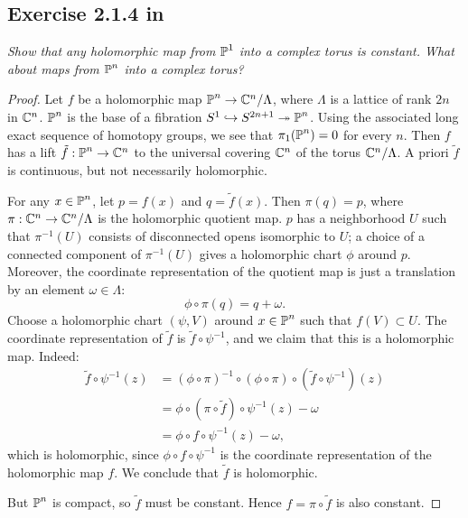 \documentclass{article}
\begin{document}
\subsection*{Exercise 2.1.4 in \cite{Huy}}
\emph{Show that any holomorphic map from $\operatorname{\mathbb{P}}^1$ into a complex torus is constant. What about maps from
$\operatorname{\mathbb{P}}^n$ into a complex torus?}
\begin{proof}
Let $f$ be a holomorphic map $\operatorname{\mathbb{P}}^n \to \mathbb{C}^n / \Lambda$, where $\Lambda$ is a lattice of rank $2n$ in $\mathbb{C}^n$.
$\operatorname{\mathbb{P}}^n$ is the base of a fibration $S^1 \hookrightarrow S^{2n+1} \twoheadrightarrow \operatorname{\mathbb{P}}^n$. Using the associated
long exact sequence of homotopy groups, we see that $\pi_1(\operatorname{\mathbb{P}}^n) = 0$ for every $n$. Then $f$ has a lift
$\tilde f : \operatorname{\mathbb{P}}^n \to \mathbb{C}^n$ to the universal covering $\mathbb{C}^n$ of the torus $\mathbb{C}^n / \Lambda$. A priori $\tilde f$
is continuous, but not necessarily holomorphic.

For any $x \in \operatorname{\mathbb{P}}^n$, let $p = f(x)$ and $q = \tilde f(x)$. Then $\pi(q) = p$, where $\pi : \mathbb{C}^n \to \mathbb{C}^n /\Lambda$
is the holomorphic quotient map. $p$ has a neighborhood $U$ such that $\pi^{-1}(U)$ consists of disconnected
opens isomorphic to $U$; a choice of a connected component of $\pi^{-1}(U)$ gives a holomorphic chart $\phi$ around
$p$. Moreover, the coordinate representation of the quotient map is just a translation by an element $\omega
\in \Lambda$:
\[	\phi \circ \pi(q) = q + \omega. \]
Choose a holomorphic chart $(\psi, V)$ around $x\in \operatorname{\mathbb{P}}^n$ such that $f(V) \subset U$. The coordinate representation
of $\tilde f$ is $\tilde f \circ \psi^{-1}$, and we claim that this is a holomorphic map. Indeed:
\begin{align*}
\tilde f \circ \psi^{-1} (z) &= (\phi \circ \pi)^{-1} \circ (\phi \circ \pi) \circ (\tilde f \circ \psi^{-1}) (z) \\
&= \phi \circ (\pi \circ \tilde f) \circ \psi^{-1} (z) - \omega \\
&= \phi \circ f \circ \psi^{-1} (z) - \omega,
\end{align*}
which is holomorphic, since $\phi \circ f \circ \psi^{-1}$ is the coordinate representation of the holomorphic
map $f$. We conclude that $\tilde f$ is holomorphic.

But $\operatorname{\mathbb{P}}^n$ is compact, so $\tilde f$ must be constant. Hence $f = \pi \circ \tilde f$ is also constant.
\end{proof}
\end{document}
